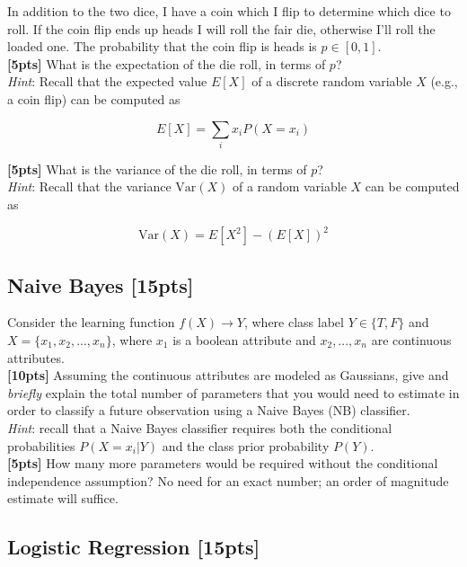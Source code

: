 \documentclass[paper=a4, fontsize=11pt]{scrartcl} %
\numberwithin{equation}{section} %
\numberwithin{figure}{section} %
\numberwithin{table}{section} %
\begin{document}
In addition to the two dice, I have a coin which I flip to determine which dice to roll. If the coin flip ends up heads I will roll the fair die, otherwise I'll roll the loaded one. The probability that the coin flip is heads is $p \in [0, 1]$. \\

\textbf{[5pts]} What is the expectation of the die roll, in terms of $p$? \\

\emph{Hint}: Recall that the expected value $E[X]$ of a discrete random variable $X$ (e.g., a coin flip) can be computed as

$$
E[X] = \sum_i x_i P(X = x_i)
$$

\textbf{[5pts]} What is the variance of the die roll, in terms of $p$? \\

\emph{Hint}: Recall that the variance $\textrm{Var}(X)$ of a random variable $X$ can be computed as 

$$
\textrm{Var}(X) = E[X^2] - (E[X])^2
$$

\subsection{Naive Bayes \textbf{[15pts]}}

Consider the learning function $f(X) \rightarrow Y$, where class label $Y \in \{T, F\}$ and $X = \{x_1, x_2, ..., x_n\}$, where $x_1$ is a boolean attribute and ${x_2, ..., x_n}$ are continuous attributes. \\

\textbf{[10pts]} Assuming the continuous attributes are modeled as Gaussians, give and \emph{briefly} explain the total number of parameters that you would need to estimate in order to classify a future observation using a Naive Bayes (NB) classifier. \\

\emph{Hint}: recall that a Naive Bayes classifier requires both the conditional probabilities $P(X = x_i | Y)$ and the class prior probability $P(Y)$. \\

\textbf{[5pts]} How many more parameters would be required without the conditional independence assumption? No need for an exact number; an order of magnitude estimate will suffice.

\subsection{Logistic Regression \textbf{[15pts]}}
\end{document}
